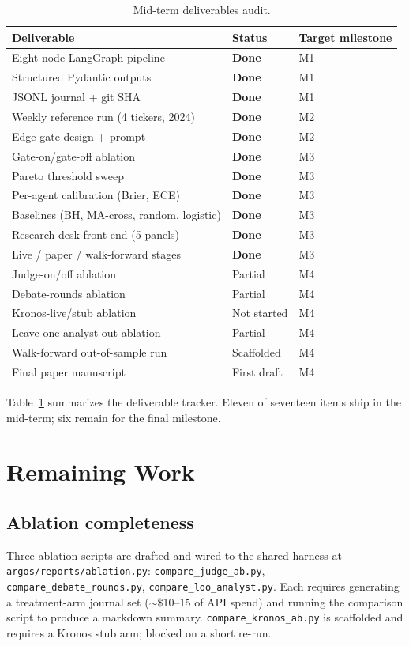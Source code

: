 \documentclass[conference]{IEEEtran}
\begin{document}
\begin{table}[t]
\caption{Mid-term deliverables audit.}
\label{tab:deliverables}
\centering\footnotesize
\begin{tabular}{p{4.0cm}p{1.4cm}p{1.9cm}}
\toprule
Deliverable & Status & Target milestone \\
\midrule
Eight-node LangGraph pipeline & \textbf{Done} & M1 \\
Structured Pydantic outputs & \textbf{Done} & M1 \\
JSONL journal + git SHA & \textbf{Done} & M1 \\
Weekly reference run (4 tickers, 2024) & \textbf{Done} & M2 \\
Edge-gate design + prompt & \textbf{Done} & M2 \\
Gate-on/gate-off ablation & \textbf{Done} & M3 \\
Pareto threshold sweep & \textbf{Done} & M3 \\
Per-agent calibration (Brier, ECE) & \textbf{Done} & M3 \\
Baselines (BH, MA-cross, random, logistic) & \textbf{Done} & M3 \\
Research-desk front-end (5 panels) & \textbf{Done} & M3 \\
Live / paper / walk-forward stages & \textbf{Done} & M3 \\
Judge-on/off ablation & Partial & M4 \\
Debate-rounds ablation & Partial & M4 \\
Kronos-live/stub ablation & Not started & M4 \\
Leave-one-analyst-out ablation & Partial & M4 \\
Walk-forward out-of-sample run & Scaffolded & M4 \\
Final paper manuscript & First draft & M4 \\
\bottomrule
\end{tabular}
\end{table}

Table~\ref{tab:deliverables} summarizes the deliverable tracker.
Eleven of seventeen items ship in the mid-term; six remain for the
final milestone.

\section{Remaining Work}

\subsection{Ablation completeness}
Three ablation scripts are drafted and wired to the shared harness
at \texttt{argos/reports/ablation.py}: \texttt{compare\_judge\_ab.py},
\texttt{compare\_debate\_rounds.py}, \texttt{compare\_loo\_analyst.py}.
Each requires generating a treatment-arm journal set
($\sim$\$10--15 of API spend) and running the comparison script to
produce a markdown summary. \texttt{compare\_kronos\_ab.py} is
scaffolded and requires a Kronos stub arm; blocked on a short
re-run.
\end{document}
